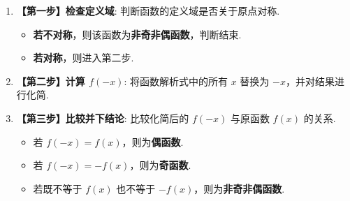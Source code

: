 \begin{note}
	\begin{enumerate}
		\item \textbf{【第一步】检查定义域}: 判断函数的定义域是否关于原点对称.
		\begin{itemize}
			\item \textbf{若不对称}，则该函数为\textbf{非奇非偶函数}，判断结束.
			\item \textbf{若对称}，则进入第二步.
		\end{itemize}
		\item \textbf{【第二步】计算 $f(-x)$}: 将函数解析式中的所有 $x$ 替换为 $-x$，并对结果进行化简.
		\item \textbf{【第三步】比较并下结论}: 比较化简后的 $f(-x)$ 与原函数 $f(x)$ 的关系.
		\begin{itemize}
			\item 若 $f(-x) = f(x)$，则为\textbf{偶函数}.
			\item 若 $f(-x) = -f(x)$，则为\textbf{奇函数}.
			\item 若既不等于 $f(x)$ 也不等于 $-f(x)$，则为\textbf{非奇非偶函数}.
		\end{itemize}
	\end{enumerate}
\end{note}

